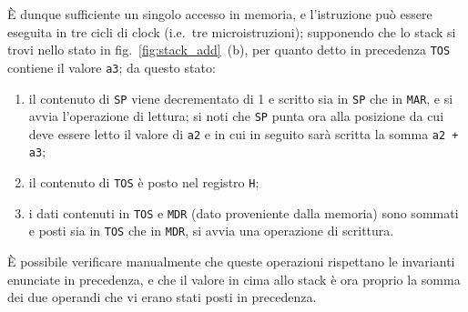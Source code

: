 \documentclass[a4paper,12pt]{scrreprt}
\begin{document}
È dunque sufficiente un singolo accesso in memoria, e l'istruzione può essere
eseguita in tre cicli di clock (i.e.~tre microistruzioni); supponendo che lo
stack si trovi nello stato in fig.~\ref{fig:stack_add}~(b), per quanto detto in
precedenza \lstinline{TOS} contiene il valore \lstinline{a3}; da questo stato:
\begin{enumerate}
  \item il contenuto di \lstinline{SP} viene decrementato di 1 e scritto sia in
  \lstinline{SP} che in \lstinline{MAR}, e si avvia l'operazione di lettura; si
  noti che \lstinline{SP} punta ora alla posizione da cui deve essere letto il
  valore di \lstinline{a2} e in cui in seguito sarà scritta la somma
  \lstinline{a2 + a3};
  \item il contenuto di \lstinline{TOS} è posto nel registro \lstinline{H};
  \item i dati contenuti in \lstinline{TOS} e \lstinline{MDR} (dato proveniente
  dalla memoria) sono sommati e posti sia in \lstinline{TOS} che in
  \lstinline{MDR}, si avvia una operazione di scrittura.
\end{enumerate}
È possibile verificare manualmente che queste operazioni rispettano le
invarianti enunciate in precedenza, e che il valore in cima allo stack è ora
proprio la somma dei due operandi che vi erano stati posti in precedenza.
\end{document}

